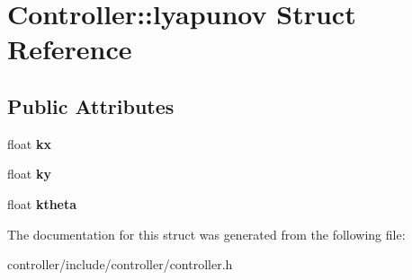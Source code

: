 \hypertarget{structController_1_1lyapunov}{}\section{Controller\+:\+:lyapunov Struct Reference}
\label{structController_1_1lyapunov}
\subsection*{Public Attributes}
\begin{DoxyCompactItemize}
\item 
float {\bfseries kx}\hypertarget{structController_1_1lyapunov_a56b832234c79347ed03bdfa1f88aa530}{}\label{structController_1_1lyapunov_a56b832234c79347ed03bdfa1f88aa530}

\item 
float {\bfseries ky}\hypertarget{structController_1_1lyapunov_a3790be122f461506e1b7a30d8a2316a4}{}\label{structController_1_1lyapunov_a3790be122f461506e1b7a30d8a2316a4}

\item 
float {\bfseries ktheta}\hypertarget{structController_1_1lyapunov_acfdb5c6549627067f54273b7fbc6ac2b}{}\label{structController_1_1lyapunov_acfdb5c6549627067f54273b7fbc6ac2b}

\end{DoxyCompactItemize}


The documentation for this struct was generated from the following file\+:\begin{DoxyCompactItemize}
\item 
controller/include/controller/controller.\+h\end{DoxyCompactItemize}
